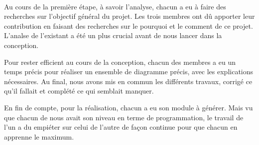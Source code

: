 \paragraph{}
Au cours de la première étape, à savoir l'analyse, chacun a eu à faire des recherches
sur l'objectif général du projet. Les trois membres ont dû apporter leur contribution
en faisant des recherches sur le pourquoi et le comment de ce projet. L'analse de
l'existant a été un plus crucial avant de nous lancer dans la conception. \par 
Pour rester efficient au cours de la conception, chacun des membres a eu un temps précis
pour réaliser un ensemble de diagramme précis, avec les explications nécessaires. Au final,
nous avons mis en commun les différents travaux, corrigé ce qu'il fallait et complété ce
qui semblait manquer. \par 
En fin de compte, pour la réalisation, chacun a eu son module à générer. Mais vu que 
chacun de nous avait son niveau en terme de programmation, le travail de l'un a du 
empiéter sur celui de l'autre de façon continue pour que chacun en apprenne le 
maximum.